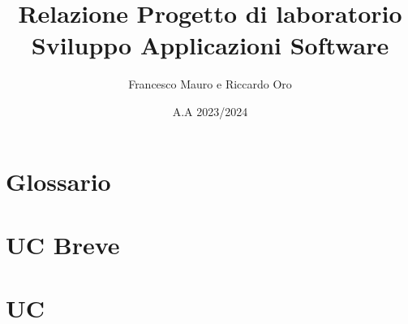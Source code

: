 \documentclass[letterpaper]{report}
\title{Relazione Progetto di laboratorio\\ Sviluppo Applicazioni Software}
\author{Francesco Mauro e Riccardo Oro}
\date{A.A 2023/2024}
\begin{document}
\maketitle
\chapter{Glossario}

\chapter{UC Breve}

\chapter{UC}

\end{document}
